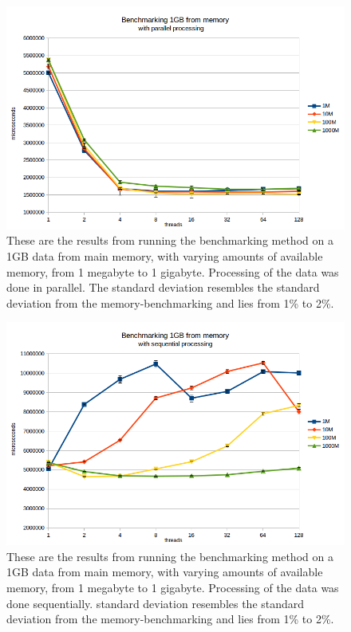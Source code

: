 \documentclass[a4paper]{article}
\begin{document}
\begin{figure}
	\begin{adjustwidth}{-0.5in}{-0.5in}
    \centering
     \includegraphics[scale=0.7]{../test_results/mem_par.png}
  	\caption{These are the results from running the benchmarking method on a 1GB data from main memory, with varying amounts of available memory, from 1 megabyte to 1 gigabyte. Processing of the data was done in parallel. The standard deviation resembles the standard deviation from the memory-benchmarking and lies from 1\% to 2\%.}
	\label{figure:mem-par}
	\end{adjustwidth}
\end{figure}

\begin{figure}
	\begin{adjustwidth}{-0.5in}{-0.5in}
    \centering
     \includegraphics[scale=0.7]{../test_results/mem_seq.png}
  	\caption{These are the results from running the benchmarking method on a 1GB data from main memory, with varying amounts of available memory, from 1 megabyte to 1 gigabyte. Processing of the data was done sequentially. standard deviation resembles the standard deviation from the memory-benchmarking and lies from 1\% to 2\%.}
	\label{figure:mem-seq}
	\end{adjustwidth}
\end{figure}
\end{document}

